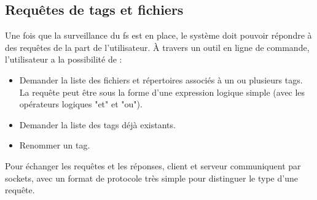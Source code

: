 \subsection{Requêtes de tags et fichiers}
Une fois que la surveillance du \acrshort{fs} est en place, le système doit pouvoir répondre 
à des requêtes de la part de l'utilisateur. À travers un outil en ligne de commande, l'utilisateur 
a la possibilité de : 
\begin{itemize}
    \item Demander la liste des fichiers et répertoires associés à un ou plusieurs tags. La requête 
        peut être sous la forme d'une expression logique simple (avec les opérateurs logiques "et" 
        et "ou").
    \item Demander la liste des tags déjà existants. 
    \item Renommer un tag. 
\end{itemize}
Pour échanger les requêtes et les réponses, client et serveur communiquent par sockets, avec un 
format de protocole très simple pour distinguer le type d'une requête.
